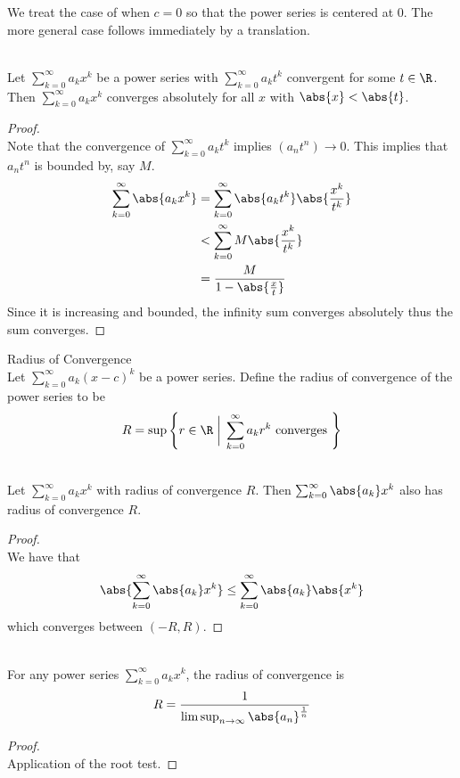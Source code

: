 \documentclass[a4paper]{article}
\begin{document}
We treat the case of when $c=0$ so that the power series is centered at $0$. The more general case follows immediately by a translation. 

\begin{prp}{}{}\\ Let $\sum_{k=0}^{\infty}a_kx^k$ be a power series with $\sum_{k=0}^{\infty}a_kt^k$ convergent for some $t\in\R$. Then $\sum_{k=0}^{\infty}a_kx^k$ converges absolutely for all $x$ with $\abs{x}<\abs{t}$. 
\begin{proof}\\ Note that the convergence of $\sum_{k=0}^{\infty}a_kt^k$ implies $(a_nt^n)\to 0$. This implies that $a_nt^n$ is bounded by, say $M$. 
\begin{align*}
\sum_{k=0}^{\infty}\abs{a_kx^k}&=\sum_{k=0}^{\infty}\abs{a_kt^k}\abs{\frac{x^k}{t^k}}\\
&<\sum_{k=0}^{\infty}M\abs{\frac{x^k}{t^k}}\\
&=\frac{M}{1-\abs{\frac{x}{t}}}\\
\end{align*} Since it is increasing and bounded, the infinity sum converges absolutely thus the sum converges. 
\end{proof}
\end{prp}

\begin{defn}{Radius of Convergence}{}\\
Let $\sum_{k=0}^\infty a_k(x-c)^k$ be a power series. Define the radius of convergence of the power series to be $$R=\sup\left\{r\in\R\;\bigg{|}\;\sum_{k=0}^\infty a_kr^k\text{ converges }\right\}$$
\end{defn}

\begin{prp}{}{}\\ Let $\sum_{k=0}^{\infty}a_kx^k$ with radius of convergence $R$. Then $\sum_{k=0}^{\infty}\abs{a_k}x^k$ also has radius of convergence $R$. 
\begin{proof}\\ We have that $$\abs{\sum_{k=0}^{\infty}\abs{a_k}x^k}\leq\sum_{k=0}^{\infty}\abs{a_k}\abs{x^k}$$ which converges between $(-R,R)$. 
\end{proof}
\end{prp}

\begin{thm}{}{}\\ For any power series $\sum_{k=0}^\infty a_kx^k$, the radius of convergence is $$R=\frac{1}{\limsup_{n\to\infty}\abs{a_n}^{\frac{1}{n}}}$$ 
\begin{proof}\\ Application of the root test. 
\end{proof}
\end{thm}
\end{document}
